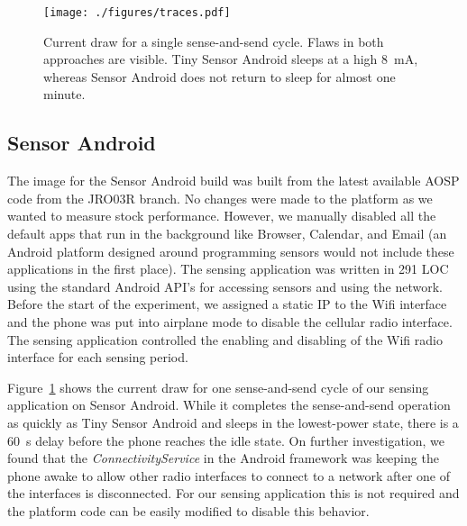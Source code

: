 \begin{figure}[t]
\texttt{[image: ./figures/traces.pdf]}

\vspace*{-0.1in}
\caption{\small Current draw for a single sense-and-send cycle.
\textnormal{Flaws in both approaches are visible. Tiny Sensor Android sleeps
at a high 8~mA, whereas Sensor Android does not return to sleep for almost
one minute.}}

\vspace*{-0.1in}

\label{fig-traces}
\end{figure}

\vspace*{0.3in}
\subsection{Sensor Android}
\label{subsec-full}

The image for the Sensor Android build was built from the latest available
AOSP code from the JRO03R branch. No changes were made to the platform as we
wanted to measure stock performance. However, we manually disabled all the
default apps that run in the background like Browser, Calendar, and Email 
(an Android platform designed around
programming sensors would not include these applications in the first place).
The sensing application was written in 291 LOC using the standard Android
API's for accessing sensors and using the network. Before the start of the
experiment, we assigned a static IP to the Wifi interface and the phone was
put into airplane mode to disable the cellular radio interface. The sensing
application controlled the enabling and disabling of the Wifi radio interface
for each sensing period.

Figure~\ref{fig-traces} shows the current draw for one sense-and-send cycle
of our sensing application on Sensor Android. While it completes the
sense-and-send operation as quickly as Tiny Sensor Android and sleeps in the
lowest-power state, there is a 60~s delay before the phone reaches the idle
state. On further investigation, we found that the
\textit{ConnectivityService} in the Android framework was keeping the phone
awake to allow other radio interfaces to connect to a network after one of
the interfaces is disconnected. For our sensing application this is not
required and the platform code can be easily modified to disable this
behavior.


